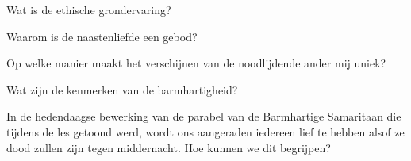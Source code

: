 \documentclass[main.tex]{subfiles}
\begin{document}
\begin{examenvraag}
    \begin{vraag}
        Wat is de ethische grondervaring?
    \end{vraag}

    \begin{antwoord}
    \end{antwoord}
\end{examenvraag}


\begin{examenvraag}
    \begin{vraag}
        Waarom is de naastenliefde een gebod?
    \end{vraag}

    \begin{antwoord}
    \end{antwoord}
\end{examenvraag}


\begin{examenvraag}
    \begin{vraag}
        Op welke manier maakt het verschijnen van de noodlijdende ander mij uniek?
    \end{vraag}

    \begin{antwoord}
    \end{antwoord}
\end{examenvraag}


\begin{examenvraag}
    \begin{vraag}
        Wat zijn de kenmerken van de barmhartigheid?
    \end{vraag}

    \begin{antwoord}
    \end{antwoord}
\end{examenvraag}


\begin{examenvraag}
    \begin{vraag}
        In de hedendaagse bewerking van de parabel van de Barmhartige Samaritaan die tijdens de les getoond werd, wordt ons aangeraden iedereen lief te hebben alsof ze dood zullen zijn tegen middernacht. Hoe kunnen we dit begrijpen?
    \end{vraag}

    \begin{antwoord}
    \end{antwoord}
\end{examenvraag}
\end{document}
